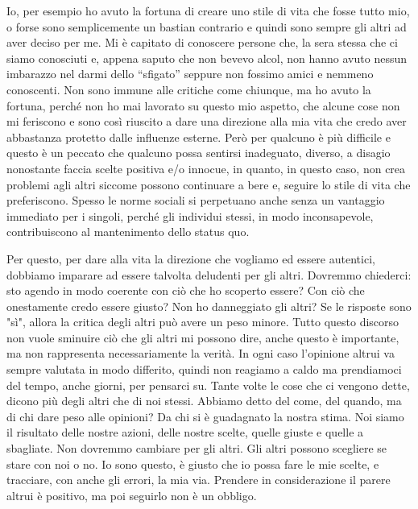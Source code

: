 \documentclass[12pt]{book} %
\begin{document}
Io, per esempio ho avuto la fortuna di creare uno stile di vita che fosse tutto mio, o forse sono semplicemente un
bastian contrario e quindi sono sempre gli altri ad aver deciso per me. Mi è capitato di conoscere persone che, la sera
stessa che ci siamo conosciuti e, appena saputo che non bevevo alcol, non hanno avuto nessun imbarazzo nel darmi dello
“sfigato” seppure non fossimo amici e nemmeno conoscenti. Non sono immune alle critiche come chiunque, ma ho avuto la
fortuna, perché non ho mai lavorato su questo mio aspetto, che alcune cose non mi feriscono e sono così riuscito a dare
una direzione alla mia vita che credo aver abbastanza protetto dalle influenze esterne. Però per qualcuno è più
difficile e questo è un peccato che qualcuno possa sentirsi inadeguato, diverso, a disagio nonostante faccia scelte
positiva e/o innocue, in quanto, in questo caso, non crea problemi agli altri siccome possono continuare a bere e,
seguire lo stile di vita che preferiscono. Spesso le norme sociali si perpetuano anche senza un vantaggio immediato per i singoli, perché gli individui stessi, in modo inconsapevole, contribuiscono al mantenimento dello status quo. 

Per questo, per dare alla vita la direzione che vogliamo ed essere autentici, dobbiamo imparare ad essere talvolta
deludenti per gli altri.
Dovremmo chiederci: sto agendo in modo coerente con ciò che ho scoperto essere? Con ciò che onestamente credo essere giusto? Non ho danneggiato gli altri? Se le risposte sono "sì", allora la critica degli altri può avere un peso minore. Tutto questo discorso non vuole sminuire ciò che gli altri mi possono dire, anche questo è importante, ma non rappresenta necessariamente la verità.
In ogni caso l'opinione altrui va sempre valutata in modo differito, quindi non reagiamo a caldo ma prendiamoci del tempo, anche giorni, per pensarci su. Tante volte le cose che ci vengono dette, dicono più degli altri che di noi stessi.
Abbiamo detto del come, del quando, ma di chi dare peso alle opinioni? Da chi si è guadagnato la nostra stima.
Noi siamo il risultato delle nostre azioni, delle nostre scelte, quelle giuste e quelle a sbagliate. Non dovremmo cambiare per gli altri. Gli altri possono scegliere se stare con noi o no. Io sono questo, è giusto che io possa fare le mie scelte, e tracciare, con anche gli errori, la mia via.
Prendere in considerazione il parere altrui è positivo, ma poi seguirlo non è un obbligo. 
\end{document}

